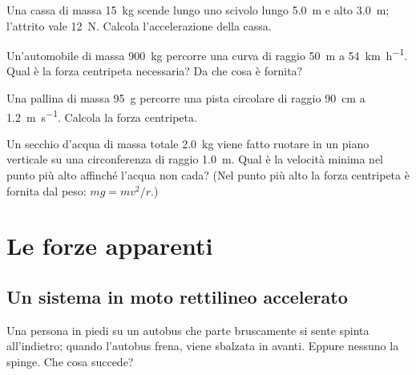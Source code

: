 \begin{esercizio}
Una cassa di massa \SI{15}{\kilo\gram} scende lungo uno scivolo lungo \SI{5,0}{\metre} e alto \SI{3,0}{\metre}; l'attrito vale \SI{12}{\newton}. Calcola l'accelerazione della cassa.\\
\end{esercizio}

\begin{esercizio}
Un'automobile di massa \SI{900}{\kilo\gram} percorre una curva di raggio \SI{50}{\metre} a \SI{54}{\kilo\metre\per\hour}. Qual è la forza centripeta necessaria? Da che cosa è fornita?\\
\end{esercizio}

\begin{esercizio}
Una pallina di massa \SI{95}{\gram} percorre una pista circolare di raggio \SI{90}{\centi\metre} a \SI{1,2}{\metre\per\second}. Calcola la forza centripeta.\\
\end{esercizio}

\begin{esercizio}
Un secchio d'acqua di massa totale \SI{2,0}{\kilo\gram} viene fatto ruotare in un piano verticale su una circonferenza di raggio \SI{1,0}{\metre}. Qual è la velocità minima nel punto più alto affinché l'acqua non cada? (Nel punto più alto la forza centripeta è fornita dal peso: $m g = m v^2/r$.)\\
\end{esercizio}

\section{Le forze apparenti}
\label{sec:forze-apparenti}

\subsection{Un sistema in moto rettilineo accelerato}
Una persona in piedi su un autobus che parte bruscamente si sente spinta all'indietro; quando l'autobus frena, viene sbalzata in avanti. Eppure nessuno la spinge. Che cosa succede?


